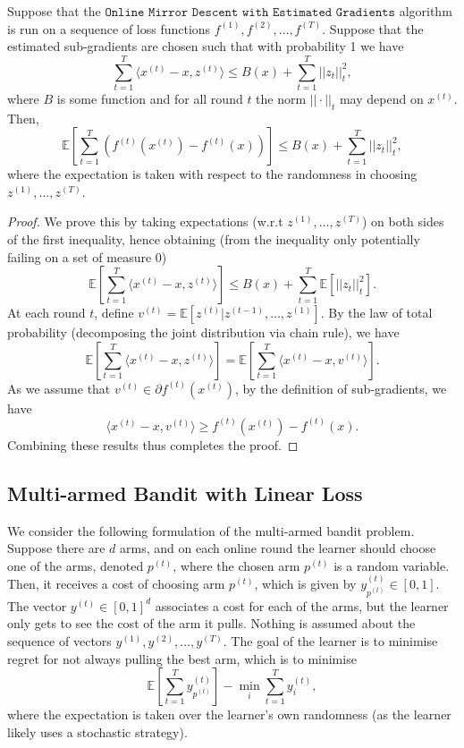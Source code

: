 \begin{theorem}\label{thm:est_grad_bound}
Suppose that the $\texttt{Online Mirror Descent with Estimated Gradients}$ algorithm is run on a sequence of loss functions $f^{(1)}, f^{(2)}, \dots, f^{(T)}$. Suppose that the estimated sub-gradients are chosen such that with probability 1 we have
$$ \sum_{t=1}^T \langle x^{(t)} - x, z^{(t)} \rangle \leq B(x) + \sum_{t=1}^{T} ||z_t||^2_t,$$
where $B$ is some function and for all round $t$ the norm $||\cdot||_t$ may depend on $x^{(t)}$. Then,
$$ \mathbb{E}\left[ \sum_{t=1}^{T} \left( f^{(t)}(x^{(t)}) - f^{(t)}(x) \right) \right] \leq B(x) + \sum_{t=1}^{T} ||z_t||^2_t, $$
where the expectation is taken with respect to the randomness in choosing $z^{(1)}, \dots, z^{(T)}$.
\end{theorem}
\begin{proof}
    We prove this by taking expectations (w.r.t $z^{(1)}, \dots, z^{(T)}$) on both sides of the first inequality, hence obtaining (from the inequality only potentially failing on a set of measure $0$)
    $$ \mathbb{E}\left[\sum_{t=1}^T \langle x^{(t)} - x, z^{(t)} \rangle\right] \leq B(x) + \sum_{t=1}^{T} \mathbb{E}\left[||z_t||^2_t\right].$$
    At each round $t$, define $v^{(t)} = \mathbb{E}\left[z^{(t)}|z^{(t-1)}, \dots, z^{(1)}\right]$. By the law of total probability (decomposing the joint distribution via chain rule), we have
    $$ \mathbb{E}\left[\sum_{t=1}^T \langle x^{(t)} - x, z^{(t)} \rangle\right] = \mathbb{E}\left[\sum_{t=1}^T \langle x^{(t)} - x, v^{(t)} \rangle\right]. $$
    As we assume that $v^{(t)} \in \partial f^{(t)}(x^{(t)})$, by the definition of sub-gradients, we have 
    $$ \langle x^{(t)} - x, v^{(t)} \rangle \geq f^{(t)}(x^{(t)}) - f^{(t)}(x). $$
    Combining these results thus completes the proof.
\end{proof}

\subsection{Multi-armed Bandit with Linear Loss}
We consider the following formulation of the multi-armed bandit problem. Suppose there are $d$ arms, and on each online round the learner should choose one of the arms, denoted $p^{(t)}$, where the chosen arm $p^{(t)}$ is a random variable. Then, it receives a cost of choosing arm $p^{(t)}$, which is given by $y^{(t)}_{p^{(t)}} \in [0, 1]$. The vector $y^{(t)} \in [0, 1]^d$ associates a cost for each of the arms, but the learner only gets to see the cost of the arm it pulls. Nothing is assumed about the sequence of vectors $y^{(1)}, y^{(2)}, \dots, y^{(T)}$. The goal of the learner is to minimise regret for not always pulling the best arm, which is to minimise
$$ \mathbb{E}\left[ \sum_{t=1}^T y^{(t)}_{p^{(t)}}\right] - \min_{i} \sum_{t=1}^T y^{(t)}_i, $$
where the expectation is taken over the learner's own randomness (as the learner likely uses a stochastic strategy).

